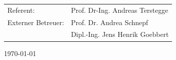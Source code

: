 \begin{titlepage}
	\vspace{2.1cm}

	\centering \begin{minipage}[t]{9cm}
		\centering \begin{tabular}{ll}
			Referent: & Prof. Dr-Ing. Andreas Terstegge\\
			Externer Betreuer: & Prof. Dr. Andrea Schnepf\\
            &Dipl.-Ing. Jens Henrik Goebbert
		\end{tabular}
	\end{minipage}

	\vspace{7cm}



	\centering %
	\begin{minipage}[b]{5cm}
			\centering
			\today\\ %
	\end{minipage}

	\restoregeometry
\end{titlepage}

